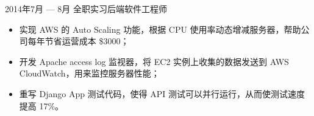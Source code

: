 \documentclass{resume}
\begin{document}
\begin{body}
	{2014年7月 --- 8月}
	{全职实习后端软件工程师}
	\begin{itemize}[noitemsep,topsep=0pt]
		\item 实现 AWS 的 Auto Scaling 功能，根据 CPU 使用率动态增减服务器，帮助公司每年节省运营成本 \$3000；
		\item 开发 Apache access log 监视器，将 EC2 实例上收集的数据发送到 AWS CloudWatch，用来监控服务器性能；
		\item 重写 Django App 测试代码，使得 API 测试可以并行运行，从而使测试速度提高 17\%。
	\end{itemize}
\end{body}

\smallskip

\end{document}
